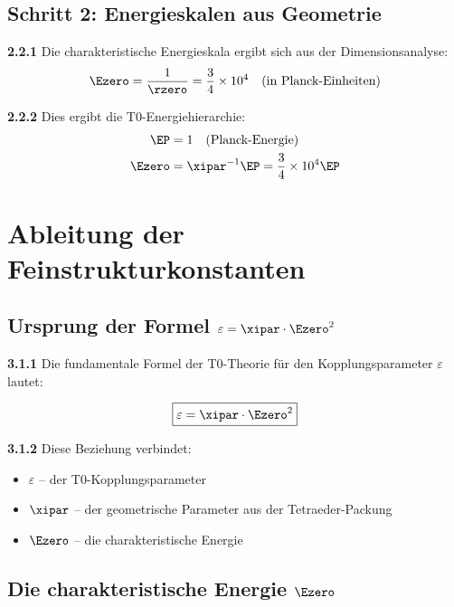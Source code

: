 	\subsection{Schritt 2: Energieskalen aus Geometrie}
	
	\noindent \textbf{2.2.1} Die charakteristische Energieskala ergibt sich aus der Dimensionsanalyse:
	\begin{equation}
		\Ezero = \frac{1}{\rzero} = \frac{3}{4} \times 10^{4} \quad \text{(in Planck-Einheiten)}
	\end{equation}
	
	\noindent \textbf{2.2.2} Dies ergibt die T0-Energiehierarchie:
	\begin{align}
		\EP &= 1 \quad \text{(Planck-Energie)} \\
		\Ezero &= \xipar^{-1} \EP = \frac{3}{4} \times 10^{4} \EP
	\end{align}
	
	\section{Ableitung der Feinstrukturkonstanten}
	
	\subsection{Ursprung der Formel $\varepsilon = \xipar \cdot \Ezero^2$}
	
	\noindent \textbf{3.1.1} Die fundamentale Formel der T0-Theorie für den Kopplungsparameter $\varepsilon$ lautet:
	\begin{keyresult}
		\begin{equation}
			\boxed{\varepsilon = \xipar \cdot \Ezero^2}
			\label{eq:epsilon_definition}
		\end{equation}
	\end{keyresult}
	
	\noindent \textbf{3.1.2} Diese Beziehung verbindet:
	\begin{itemize}
		\item $\varepsilon$ -- der T0-Kopplungsparameter
		\item $\xipar$ -- der geometrische Parameter aus der Tetraeder-Packung
		\item $\Ezero$ -- die charakteristische Energie
	\end{itemize}
	
	\subsection{Die charakteristische Energie $\Ezero$}
	
